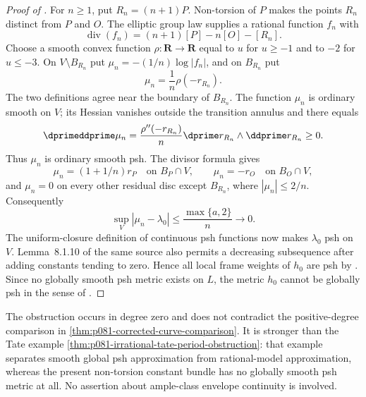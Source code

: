 \begin{proof}[Proof of ]
For $n\geq1$, put $R_n=(n+1)P$.  Non-torsion of $P$ makes the points
$R_n$ distinct from $P$ and $O$.  The elliptic group law supplies a
rational function $f_n$ with
\[
             \operatorname{div}(f_n)=(n+1)[P]-n[O]-[R_n].
\]
Choose a smooth convex function $\rho\colon\mathbf R\to\mathbf R$ equal to
$u$ for $u\geq-1$ and to $-2$ for $u\leq-3$.  On
$V\setminus B_{R_n}$ put $\mu_n=-(1/n)\log|f_n|$, and on $B_{R_n}$ put
\[
                         \mu_n=\frac1n\rho(-r_{R_n}).
\]
The two definitions agree near the boundary of $B_{R_n}$.  The function
$\mu_n$ is ordinary smooth on $V$; its Hessian vanishes outside the
transition annulus and there equals
\[
 \dprimeddprime\mu_n=
   \frac{\rho''(-r_{R_n})}{n}
       \dprime r_{R_n}\wedge\ddprime r_{R_n}\geq0.
\]
Thus $\mu_n$ is ordinary smooth psh.  The divisor formula gives
\[
 \mu_n=(1+1/n)r_P\quad\text{on }B_P\cap V,
 \qquad
 \mu_n=-r_O\quad\text{on }B_O\cap V,
\]
and $\mu_n=0$ on every other residual disc except $B_{R_n}$, where
$|\mu_n|\leq2/n$.  Consequently
\[
                    \sup_V|\mu_n-\lambda_0|
                    \leq\frac{\max\{a,2\}}n\longrightarrow0.
\]
The uniform-closure definition of continuous psh functions
\cite[Definition~8.1.7 and Propositions~8.1.9, 8.1.11]{CLD25} now makes
$\lambda_0$ psh on $V$.  Lemma~8.1.10 of the same source also permits a
decreasing subsequence after adding constants tending to zero.  Hence all
local frame weights of $h_0$ are psh by
\cite[Definition~17.8.1]{CLD25}.  Since no globally smooth psh metric exists
on $L$, the metric $h_0$ cannot be globally psh in the sense of
\cite[\S17.8.5]{CLD25}.
\end{proof}

\begin{remark}\label{rem:supplied-p081-scope}
The obstruction occurs in degree zero and does not contradict the
positive-degree comparison in
\cref{thm:p081-corrected-curve-comparison}.  It is stronger than the Tate
example \cref{thm:p081-irrational-tate-period-obstruction}: that example
separates smooth global psh approximation from rational-model
approximation, whereas the present non-torsion constant bundle has no
globally smooth psh metric at all.  No assertion about ample-class envelope
continuity is involved.
\end{remark}
